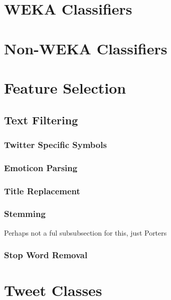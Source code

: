 \documentclass[12pt]{ucthesis}
\begin{document}
\section{WEKA Classifiers}
\label{class-weka}

\section{Non-WEKA Classifiers}
\label{class-nonweka}

\section{Feature Selection}
\label{class-features}

\subsection{Text Filtering}
\label{class-filtering}

\subsubsection{Twitter Specific Symbols}
\label{class-twitter-symbols}

\subsubsection{Emoticon Parsing}
\label{class-emoticon}

\subsubsection{Title Replacement}
\label{class-title}

\subsubsection{Stemming}
\label{class-stemming}
Perhaps not a ful subsubsection for this, just Porters

\subsubsection{Stop Word Removal}
\label{class-stopword}

\section{Tweet Classes}
\label{class-tweet-classes}
\end{document}
